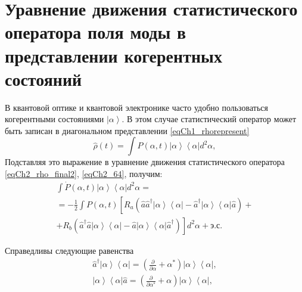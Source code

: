 \section{Уравнение движения статистического оператора поля моды в
  представлении когерентных состояний}
В квантовой оптике и квантовой электронике часто удобно пользоваться
когерентными состояниями $\left|\alpha\right>$.  В этом случае
статистический оператор может быть записан в диагональном
представлении \eqref{eqCh1_rhorepresent}  
\begin{equation}
\hat{\rho}\left(t\right) = \int
P\left(\alpha, t\right)\left|\alpha\right>\left<\alpha\right| d^2 \alpha,
\label{eqCh2_65}
\end{equation}
Подставляя это выражение в уравнение движения статистического
оператора \eqref{eqCh2_rho_final2}, \ref{eqCh2_64}, получим: 
\begin{eqnarray}
\int \dot{P}\left(\alpha, t\right)\left|\alpha\right>\left<\alpha\right|
d^2 \alpha  = 
\nonumber \\
= -\frac{1}{2}\int P\left(\alpha, t\right)\left[R_a
\left(\hat{a}\hat{a}^{\dag}\left|\alpha\right>\left<\alpha\right|-\hat{a}^{\dag}\left|\alpha\right>\left<\alpha\right|\hat{a}\right)
\right. +
\nonumber \\
+
\left.
R_b
\left(\hat{a}^{\dag}\hat{a}\left|\alpha\right>\left<\alpha\right|-\hat{a}\left|\alpha\right>\left<\alpha\right|\hat{a}^{\dag}\right)
\right]d^2 \alpha +\mbox{э.с.}
\label{eqCh2_66}
\end{eqnarray}

Справедливы следующие равенства
\begin{eqnarray}
\hat{a}^{\dag}\left|\alpha\right>\left<\alpha\right| = 
\left(\frac{\partial}{\partial \alpha} +
\alpha^{*}\right)\left|\alpha\right>\left<\alpha\right|, 
\nonumber \\
\left|\alpha\right>\left<\alpha\right|\hat{a} = 
\left(\frac{\partial}{\partial \alpha^{*}} +
\alpha\right)\left|\alpha\right>\left<\alpha\right|, 
\label{eqCh2_67}
\end{eqnarray}

